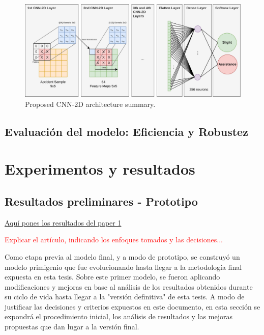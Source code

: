 \documentclass{uathesis-es}
\begin{document}
\begin{figure}[H]
    \centering
    \includegraphics[width=15cm]{Figures/SIMPLE.png}
    \caption{Proposed CNN-2D architecture summary.}
    \label{CNN2DArchitecture}
\end{figure}

\section{Evaluación del modelo: Eficiencia y Robustez}


\chapter{Experimentos y resultados}



\section{Resultados preliminares - Prototipo}

\underline{Aquí pones los resultados del paper 1}


\textcolor{red}{Explicar el artículo, indicando los enfoques tomados y las decisiones...}

Como etapa previa al modelo final, y a modo de prototipo, se construyó un modelo primigenio que fue evolucionando hasta llegar a la metodología final expuesta en esta tesis. Sobre este primer modelo, se fueron aplicando modificaciones y mejoras en base al análisis de los resultados obtenidos durante su ciclo de vida hasta llegar a la "versión definitiva" de esta tesis. A modo de justificar las decisiones y criterios expuestos en este documento, en esta sección se expondrá el procedimiento inicial, los análisis de resultados y las mejoras propuestas que dan lugar a la versión final.


\end{document}
